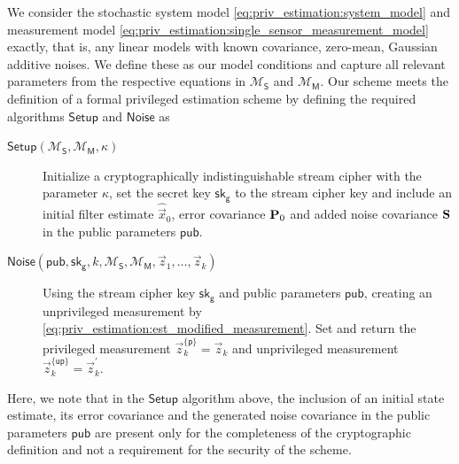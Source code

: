 We consider the stochastic system model \eqref{eq:priv_estimation:system_model} and measurement model \eqref{eq:priv_estimation:single_sensor_measurement_model} exactly, that is, any linear models with known covariance, zero-mean, Gaussian additive noises. We define these as our model conditions and capture all relevant parameters from the respective equations in $\mathcal{M}_{\mathsf{S}}$ and $\mathcal{M}_{\mathsf{M}}$. Our scheme meets the definition of a formal privileged estimation scheme by defining the required algorithms $\mathsf{Setup}$ and $\mathsf{Noise}$ as
\begin{description}
   \item[$\mathsf{Setup}(\mathcal{M}_{\mathsf{S}}, \mathcal{M}_{\mathsf{M}}, \kappa)$] Initialize a cryptographically indistinguishable stream cipher with the parameter $\kappa$, set the secret key $\mathsf{sk}_{\mathsf{g}}$ to the stream cipher key and include an initial filter estimate $\hat{\vec{x}}_0$, error covariance ${{\mathbf{P}}}_0$ and added noise covariance ${{\mathbf{S}}}$ in the public parameters $\mathsf{pub}$.
   \item[$\mathsf{Noise}(\mathsf{pub}, \mathsf{sk}_{\mathsf{g}}, k, \mathcal{M}_{\mathsf{S}}, \mathcal{M}_{\mathsf{M}}, \vec{z}_1, \dots, \vec{z}_k)$] Using the stream cipher key $\mathsf{sk}_{\mathsf{g}}$ and public parameters $\mathsf{pub}$, creating an unprivileged measurement by \eqref{eq:priv_estimation:est_modified_measurement}. Set and return the privileged measurement $\vec{z}^{\{\mathsf{p}\}}_k=\vec{z}_k$ and unprivileged measurement $\vec{z}^{\{\mathsf{up}\}}_k=\vec{z}^\prime_k$.
\end{description}
Here, we note that in the $\mathsf{Setup}$ algorithm above, the inclusion of an initial state estimate, its error covariance and the generated noise covariance in the public parameters $\mathsf{pub}$ are present only for the completeness of the cryptographic definition and not a requirement for the security of the scheme.

